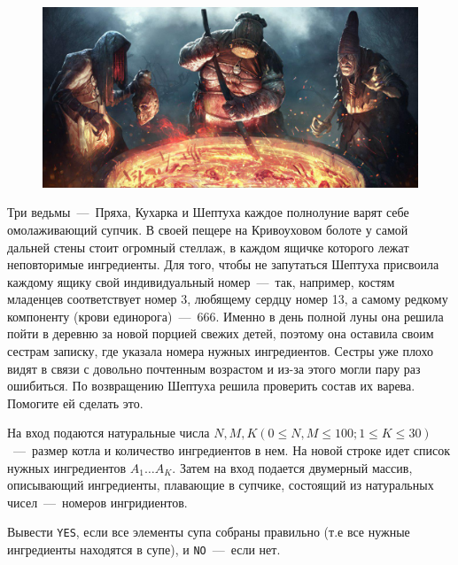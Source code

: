 \begin{figure}[h!]
	\centering
	\includegraphics[width=\linewidth, keepaspectratio]{soup.jpg}
\end{figure}

Три ведьмы~---~Пряха, Кухарка и Шептуха каждое полнолуние варят себе омолаживающий супчик. 
В своей пещере на Кривоуховом болоте у самой дальней стены стоит огромный стеллаж, в каждом ящичке которого лежат неповторимые ингредиенты. 
Для того, чтобы не запутаться Шептуха присвоила каждому ящику свой индивидуальный номер~---~так, например, 
костям младенцев соответствует номер 3, любящему сердцу номер 13, а самому редкому компоненту (крови единорога)~---~666. 
Именно в день полной луны она решила пойти в деревню за новой порцией свежих детей, поэтому она оставила своим сестрам записку, где указала номера нужных ингредиентов. 
Сестры уже плохо видят в связи с довольно почтенным возрастом и из-за этого могли пару раз ошибиться. 
По возвращению Шептуха решила проверить состав их варева. Помогите ей сделать это.

\InputFile
\noindent
На вход подаются натуральные числа $N, M, K (0 \le N, M \leq 100; 1 \le K \leq 30)$~---~размер котла и количество ингредиентов в нем.
На новой строке идет список нужных ингредиентов $A_1 \ldots A_K$.
Затем на вход подается двумерный массив, описывающий ингредиенты, плавающие в супчике, состоящий из натуральных чисел~---~номеров ингридиентов.


\OutputFile
\noindent

Вывести \texttt{YES}, если все элементы супа собраны правильно (т.е все нужные ингредиенты находятся в супе), и \texttt{NO}~---~если нет.

\SAMPLES
